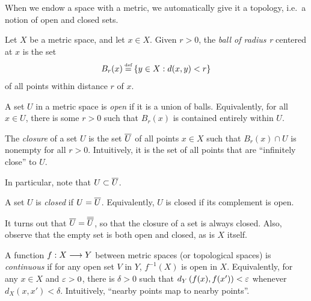 \documentclass[twoside]{article}
\newcommand*{\1}{\mathbbm{1}}
\begin{document}
When we endow a space with a metric, we automatically give it a topology, i.e.\ a notion of open and closed sets.
\begin{defn}
  Let \(X\) be a metric space, and let \(x\in X\). Given \(r>0\), the \emph{ball of radius r} centered at \(x\) is the set
  \[
    B_r(x) \defeq \set{y\in X: d(x,y) < r}
  \]
  of all points within distance \(r\) of \(x\).
\end{defn}
\begin{defn}
  A set \(U\) in a metric space is \emph{open} if it is a union of balls. Equivalently, for all \(x\in U\), there is some \(r>0\) such that \(B_r(x)\) is contained entirely within \(U\).
\end{defn}
\begin{defn}
  The \emph{closure} of a set \(U\) is the set \(\overline{U}\) of all points \(x\in X\) such that \(B_r(x)\cap U\) is nonempty for all \(r>0\). Intuitively, it is the set of all points that are ``infinitely close'' to \(U\).

  In particular, note that \(U \subset \overline{U}\).
\end{defn}
\begin{defn}
  A set \(U\) is \emph{closed} if \(U = \overline{U}\). Equivalently, \(U\) is closed if its complement is open.
\end{defn}
\noindent
It turns out that \(\overline{U} = \overline{\overline{U}}\), so that the closure of a set is always closed. Also, observe that the empty set is both open and closed, as is \(X\) itself.

\begin{defn}
  A function \(f:X\longrightarrow Y\) between metric spaces (or topological spaces) is \emph{continuous} if for any open set \(V\) in \(Y\), \(f^{-1}(X)\) is open in \(X\). Equivalently, for any \(x\in X\) and \(\varepsilon > 0\), there is \(\delta > 0\) such that \(d_Y\del{f(x), f(x')} < \ve\) whenever \(d_X(x, x') < \delta\). Intuitively, ``nearby points map to nearby points''.
\end{defn}
\end{document}
